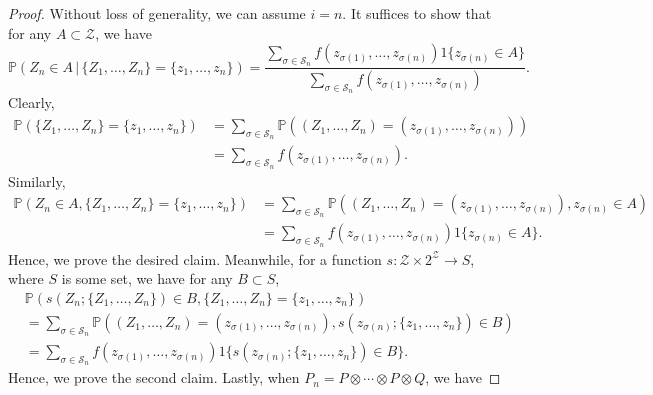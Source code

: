 \documentclass[11pt,letterpaper]{article}
\theoremstyle{definition}
\newcommand{\cS}{\mathcal{S}}
\newcommand{\cZ}{\mathcal{Z}}
\renewcommand{\P}{\mathbb{P}}
\begin{document}
\begin{proof}
    Without loss of generality, we can assume $i = n$. It suffices to show that for any $A \subset \cZ$, we have
    \begin{equation*}
        \P(Z_n \in A \, | \, \{Z_1, \ldots, Z_n\} = \{z_1, \ldots, z_n\}) = \frac{\sum_{\sigma \in \cS_n} f(z_{\sigma(1)}, \ldots, z_{\sigma(n)}) 1\{z_{\sigma(n)} \in A\}}{\sum_{\sigma \in \cS_n} f(z_{\sigma(1)}, \ldots, z_{\sigma(n)})}.
    \end{equation*}
    Clearly, 
    \begin{equation*}
        \begin{split}
            \P(\{Z_1, \ldots, Z_n\} = \{z_1, \ldots, z_n\})
            & = \sum_{\sigma \in \cS_n} \P((Z_1, \ldots, Z_n) = (z_{\sigma(1)}, \ldots, z_{\sigma(n)})) \\
            & = \sum_{\sigma \in \cS_n} f(z_{\sigma(1)}, \ldots, z_{\sigma(n)}).
        \end{split}
    \end{equation*}
    Similarly, 
    \begin{equation*}
        \begin{split}
            \P(Z_n \in A, \{Z_1, \ldots, Z_n\} = \{z_1, \ldots, z_n\}) 
            & = \sum_{\sigma \in \cS_n} \P((Z_1, \ldots, Z_n) = (z_{\sigma(1)}, \ldots, z_{\sigma(n)}), z_{\sigma(n)} \in A) \\
            & = \sum_{\sigma \in \cS_n} f(z_{\sigma(1)}, \ldots, z_{\sigma(n)}) 1\{z_{\sigma(n)} \in A\}.
        \end{split}
    \end{equation*}
    Hence, we prove the desired claim. Meanwhile, for a function $s \colon \cZ \times 2^\cZ \to S$, where $S$ is some set, we have for any $B \subset S$,
    \begin{equation*}        
        \begin{split}
            & \P(s(Z_n; \{Z_1, \ldots, Z_n\}) \in B, \{Z_1, \ldots, Z_n\} = \{z_1, \ldots, z_n\}) \\
            & = \sum_{\sigma \in \cS_n} \P((Z_1, \ldots, Z_n) = (z_{\sigma(1)}, \ldots, z_{\sigma(n)}), s(z_{\sigma(n)}; \{z_1, \ldots, z_n\}) \in B) \\
            & = \sum_{\sigma \in \cS_n} f(z_{\sigma(1)}, \ldots, z_{\sigma(n)}) 1\{s(z_{\sigma(n)}; \{z_1, \ldots, z_n\}) \in B\}.
        \end{split}
    \end{equation*}
    Hence, we prove the second claim. Lastly, when $P_n = P \otimes \cdots \otimes P \otimes Q$, we have

\end{proof}
\end{document}
